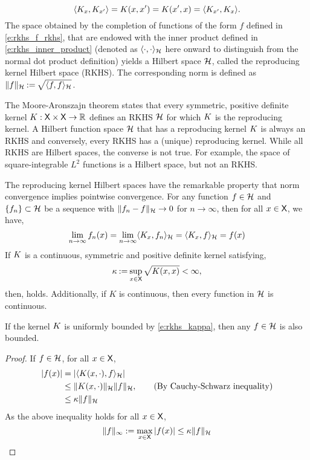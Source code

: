 \begin{equation}
\langle K_x, K_{x'} \rangle =  K(x,x') = K(x',x) =  \langle K_{x'}, K_x \rangle. 
\end{equation}
The space obtained by the completion of functions of the form $f$ defined in \eqref{e:rkhs_f_rkhs}, that are endowed with the inner product defined in \eqref{e:rkhs_inner_product} (denoted as $\langle \cdot, \cdot \rangle_{{\cal H}}$ here onward to distinguish from the normal dot product definition) yields a Hilbert space ${\cal H}$, called the reproducing kernel Hilbert space (RKHS). The corresponding norm is defined as $\|f\|_{\cal H} \mathbin{:=} \sqrt{\langle f, f \rangle_{\cal H}}$. 

The Moore-Aronszajn theorem states that every symmetric, positive definite kernel $K : {\sf X} \times {\sf X} \to \mathbb{R}$ defines an RKHS ${\cal H}$ for which $K$ is the reproducing kernel. A Hilbert function space ${\cal H}$ that has a reproducing kernel $K$ is always an RKHS and conversely, every RKHS has a (unique) reproducing kernel. While all RKHS are Hilbert spaces, the converse is not true. For example, the space of square-integrable $L^2$ functions is a Hilbert space, but not an RKHS. 

The reproducing kernel Hilbert spaces have the remarkable property that norm convergence implies pointwise convergence. 
For any function $f\in{\cal H}$ and $\{f_n\}\subset {\cal H}$ be a sequence with $\|f_n - f\|_{\cal H} \to 0$ for $n \to \infty$, then for all $x \in {\sf X}$, we have,
\begin{equation}
\lim_{n\to\infty} f_n(x) = \lim_{n \to \infty} \langle K_x,  f_n \rangle_{\cal H} = \langle K_x, f \rangle_{\cal H} = f(x)
\end{equation}
If $K$ is a continuous, symmetric and positive definite kernel satisfying, 
\begin{equation}
\kappa \eqdef \sup_{x \in \state} \sqrt{\Kern(x,x)} < \infty,
\label{e:rkhs_kappa}
\end{equation}
then,  holds. Additionally, if $K$ is continuous, then every function in ${\cal H}$ is continuous. 
\begin{proposition}
\label{prop:RKHS_bounded}
	If the kernel $K$ is uniformly bounded by \eqref{e:rkhs_kappa}, then any $f \in {\cal H}$ is also bounded. 
\end{proposition}
\begin{proof}
	If $f \in {\cal H}$, for all $x \in {\sf X}$,
	\begin{equation}
	\begin{aligned}
	|f(x)| &= |\langle K(x,\cdot), f \rangle_{\cal H}| \\
	& \leq \|K(x,\cdot)\|_{\cal H} \|f\|_{\cal H}, \qquad{\text{(By Cauchy-Schwarz inequality)}}\\ 
	& \leq \kappa \|f\|_{\cal H}
	\end{aligned}
	\end{equation}
	As the above inequality holds for all $x \in {\sf X}$, 
	\begin{equation}
	\|f\|_\infty := \max_{x\in {\sf X}}|f(x)| \leq \kappa \|f\|_{\cal H}
	\end{equation}
\end{proof}


